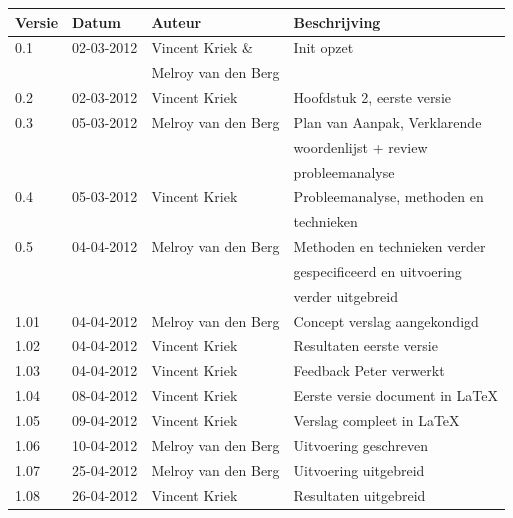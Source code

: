 \documentclass[]{article}
\begin{document}
\begin{tabular}{|| l | l | l | l ||}\hline
    Versie  &Datum       &Auteur              &Beschrijving                    \\\hline\hline
    0.1     &02-03-2012  &Vincent Kriek \&    &Init opzet                      \\
            &            &Melroy van den Berg &                                \\\hline
    0.2     &02-03-2012  &Vincent Kriek       &Hoofdstuk 2, eerste versie      \\\hline
    0.3     &05-03-2012  &Melroy van den Berg &Plan van Aanpak, Verklarende    \\
            &            &                    &woordenlijst + review           \\
            &            &                    &probleemanalyse                 \\\hline
    0.4     &05-03-2012  &Vincent Kriek       &Probleemanalyse, methoden en    \\
            &            &                    &technieken                      \\\hline
    0.5     &04-04-2012  &Melroy van den Berg &Methoden en technieken verder   \\
            &            &                    &gespecificeerd en uitvoering    \\
            &            &                    &verder uitgebreid               \\\hline
    1.01    &04-04-2012  &Melroy van den Berg &Concept verslag aangekondigd    \\\hline
    1.02    &04-04-2012  &Vincent Kriek       &Resultaten eerste versie        \\\hline
    1.03    &04-04-2012  &Vincent Kriek       &Feedback Peter verwerkt         \\\hline
    1.04    &08-04-2012  &Vincent Kriek       &Eerste versie document in \LaTeX\\\hline
    1.05    &09-04-2012  &Vincent Kriek       &Verslag compleet in \LaTeX      \\\hline
    1.06    &10-04-2012  &Melroy van den Berg &Uitvoering geschreven           \\\hline
    1.07    &25-04-2012  &Melroy van den Berg &Uitvoering uitgebreid           \\\hline
    1.08    &26-04-2012  &Vincent Kriek       &Resultaten uitgebreid           \\\hline

\end{tabular}
\end{document}
